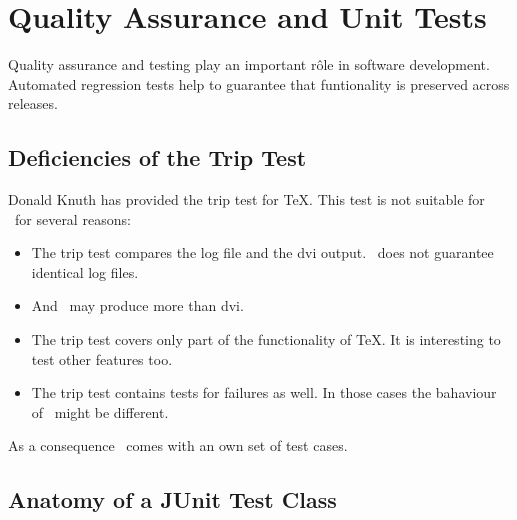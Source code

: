 \chapter{Quality Assurance and Unit Tests}\label{chapter:testing}

Quality assurance and testing play an important r\^ole in software
development. Automated regression tests help to guarantee that
funtionality is preserved across releases.


\section{Deficiencies of the Trip Test}

Donald Knuth has provided the trip test for \TeX. This test is not
suitable for \ExTeX\ for several reasons:
\begin{itemize}
\item The trip test compares the log file and the dvi output. \ExTeX\
  does not guarantee identical log files.
\item And \ExTeX\ may produce more than dvi.
\item The trip test covers only part of the functionality of \TeX. It
  is interesting to test other features too.
\item The trip test contains tests for failures as well. In those
  cases the bahaviour of \ExTeX\ might be different.
\end{itemize}

As a consequence \ExTeX\ comes with an own set of test cases.

\section{Anatomy of a JUnit Test Class}

\INCOMPLETE

